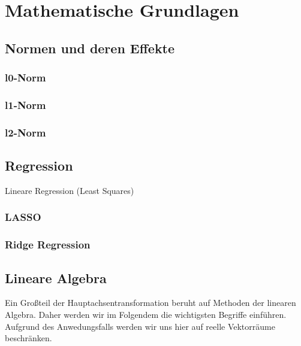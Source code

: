 \chapter{Mathematische Grundlagen}

\label{fundamentals}

\section{Normen und deren Effekte}

\subsection{l0-Norm}
\subsection{l1-Norm}
\subsection{l2-Norm}

\section{Regression}
Lineare Regression (Least Squares)
\subsection{LASSO}
\subsection{Ridge Regression}

\section{Lineare Algebra}

Ein Großteil der Hauptachsentransformation beruht auf Methoden der linearen Algebra. Daher werden wir im Folgendem die wichtigsten Begriffe einführen. Aufgrund des Anwedungsfalls werden wir uns hier auf reelle Vektorräume beschränken.

